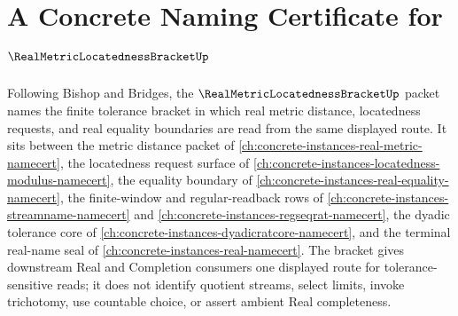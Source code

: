 \chapter{A Concrete Naming Certificate for $\RealMetricLocatednessBracketUp$}
\label{ch:concrete-instances-real-metric-locatedness-bracket-namecert}

Following Bishop and Bridges, the $\RealMetricLocatednessBracketUp$ packet names the finite tolerance bracket in which real metric distance, locatedness requests, and real equality boundaries are read from the same displayed route. It sits between the metric distance packet of \autoref{ch:concrete-instances-real-metric-namecert}, the locatedness request surface of \autoref{ch:concrete-instances-locatedness-modulus-namecert}, the equality boundary of \autoref{ch:concrete-instances-real-equality-namecert}, the finite-window and regular-readback rows of \autoref{ch:concrete-instances-streamname-namecert} and \autoref{ch:concrete-instances-regseqrat-namecert}, the dyadic tolerance core of \autoref{ch:concrete-instances-dyadicratcore-namecert}, and the terminal real-name seal of \autoref{ch:concrete-instances-real-namecert}. The bracket gives downstream Real and Completion consumers one displayed route for tolerance-sensitive reads; it does not identify quotient streams, select limits, invoke trichotomy, use countable choice, or assert ambient Real completeness.

